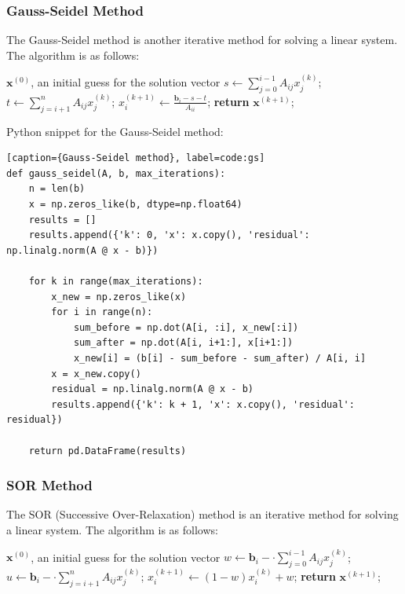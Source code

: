 \documentclass[10pt]{article}
\begin{document}
\subsubsection{Gauss-Seidel Method}
The Gauss-Seidel method is another iterative method for solving a linear system. The algorithm is as follows:
\begin{algorithm}[H]
\caption{Gauss-Seidel Method}
\begin{algorithmic}
\State $\mathbf{x}^{(0)}$, an initial guess for the solution vector\;
        \State $s \gets \sum_{j=0}^{i-1} A_{ij} x_j^{(k)}$;
        \State $t \gets \sum_{j=i+1}^{n} A_{ij} x_j^{(k)}$;
        \State $x_i^{(k+1)} \gets \frac{\mathbf{b}_i - s - t}{A_{ii}}$;
    \EndFor
\State \textbf{return} $\mathbf{x}^{(k+1)}$;
\end{algorithmic}
\end{algorithm}
Python snippet for the Gauss-Seidel method:
\begin{lstlisting}[style=custompython][caption={Gauss-Seidel method}, label=code:gs]
def gauss_seidel(A, b, max_iterations):
    n = len(b)
    x = np.zeros_like(b, dtype=np.float64)
    results = []
    results.append({'k': 0, 'x': x.copy(), 'residual': np.linalg.norm(A @ x - b)})
    
    for k in range(max_iterations):
        x_new = np.zeros_like(x)
        for i in range(n):
            sum_before = np.dot(A[i, :i], x_new[:i])
            sum_after = np.dot(A[i, i+1:], x[i+1:])
            x_new[i] = (b[i] - sum_before - sum_after) / A[i, i]
        x = x_new.copy()
        residual = np.linalg.norm(A @ x - b)
        results.append({'k': k + 1, 'x': x.copy(), 'residual': residual})
    
    return pd.DataFrame(results)
\end{lstlisting}


\subsubsection{SOR Method}
The SOR (Successive Over-Relaxation) method is an iterative method for solving a linear system. The algorithm is as follows:
\begin{algorithm}[H]
\caption{SOR Method}
\begin{algorithmic}
\State $\mathbf{x}^{(0)}$, an initial guess for the solution vector\;
        \State $w \gets \mathbf{b}_i - \cdot \sum_{j=0}^{i-1} A_{ij} x_j^{(k)}$;
        \State $u \gets \mathbf{b}_i - \cdot \sum_{j=i+1}^{n} A_{ij} x_j^{(k)}$;
        \State $x_i^{(k+1)} \gets (1-w) x_i^{(k)} + w$;
    \EndFor
\State \textbf{return} $\mathbf{x}^{(k+1)}$;
\end{algorithmic}
\end{algorithm}
\end{document}
